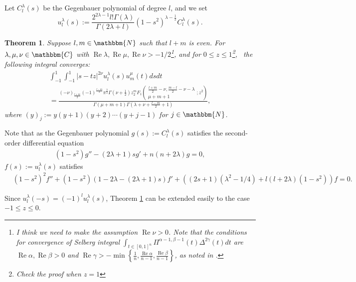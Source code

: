 \documentclass{svjour3}
\newcommand{\assign}{:=}
\newcommand{\tmop}[1]{\ensuremath{\operatorname{#1}}}
\newtheorem{theorem}{Theorem}
\begin{document}
Let $C_l^{\lambda} (s)$ be the Gegenbauer polynomial of degree $l$, and we set
\[ u_l^{\lambda} (s) \assign \frac{2^{2 \lambda - 1} l! \Gamma
   (\lambda)}{\Gamma (2 \lambda + l)} (1 - s^2)^{\lambda - \frac{1}{2}}
   C_l^{\lambda} (s) . \]
\begin{theorem}
  \label{main-thm}Suppose $l, m \in \mathbbm{N}$ such that $l + m$ is even.
  For $\lambda, \mu, \nu \in \mathbbm{C}$ with $\tmop{Re} \lambda, \tmop{Re}
  \mu, \tmop{Re} \nu > - 1 / 2$\footnote{I think we need to make the
  assumption $\tmop{Re} \nu > 0$. Note that the conditions for convergence of
  Selberg integral $\int_{t \in [0, 1]^n} \Pi^{\alpha - 1, \beta - 1} (t)
  \Delta^{2 \gamma} (t) d t$ are $\tmop{Re} \alpha, \tmop{Re} \beta > 0$ and
  $\tmop{Re} \gamma > - \min \left\{ \frac{1}{n}, \frac{\tmop{Re} \alpha}{n -
  1}, \frac{\tmop{Re} \beta}{n - 1} \right\}$, as noted in
  {\cite{forrester2008importance}}.}, and for $0 \leqslant z \leqslant
  1$\footnote{Check the proof when $z = 1$}, \ the following integral
  converges:
  \begin{eqnarray}
    & \int_{- 1}^1 \int_{- 1}^1 | s - t z |^{2 \nu} u_l^{\lambda} (s)
    u_m^{\mu} (t) d s d t &  \nonumber\\
    & = \frac{(- \nu)_{\frac{l + m}{2}} (- 1)^{\frac{l - m}{2}}
    \pi^{\frac{3}{2}} \Gamma \left( \nu + \frac{1}{2} \right) z^m _2 F_1
    \left( \begin{array}{c}
      \frac{l + m}{2} - \nu, \frac{m - l}{2} - \nu - \lambda\\
      \mu + m + 1
    \end{array} ; z^2 \right)}{\Gamma (\mu + m + 1) \Gamma \left( \lambda +
    \nu + \frac{l - m}{2} + 1 \right)},  \label{eqn:main} & 
  \end{eqnarray}
  where $(y)_j \assign y (y + 1) (y + 2) \cdots (y + j - 1)$ for $j \in
  \mathbbm{N}$.
\end{theorem}

Note that as the Gegenbauer polynomial $g (s) \assign C_l^{\lambda} (s)$
satisfies the second-order differential equation
\begin{eqnarray}
  & (1 - s^2) g'' - (2 \lambda + 1) s g' + n (n + 2 \lambda) g = 0, & 
  \nonumber
\end{eqnarray}
$f (s) \assign u_l^{\lambda} (s)$ satisfies
\begin{eqnarray}
  & (1 - s^2)^2 f'' + (1 - s^2) (1 - 2 \lambda - (2 \lambda + 1) s) f' + ((2
  s + 1) (\lambda^2 - 1 / 4) + l (l + 2 \lambda) (1 - s^2)) f = 0. & 
  \nonumber
\end{eqnarray}
\begin{remark}
  Since $u_l^{\lambda} (- s) = (- 1)^l u_l^{\lambda} (s)$, Theorem
  \ref{main-thm} can be extended easily to the case $- 1 \leqslant z \leqslant
  0$.
\end{remark}
\end{document}

